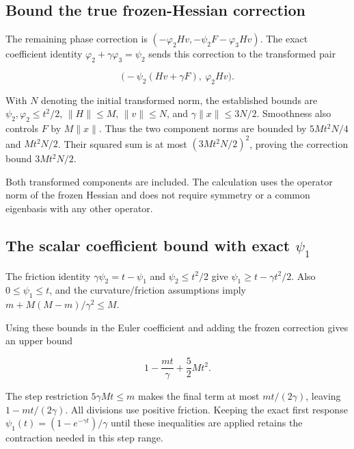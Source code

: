 \documentclass[11pt,a4paper]{report}
\begin{document}
\subsection{\texorpdfstring{Bound the true frozen-Hessian correction}{Bound the true frozen-Hessian correction}}
\label{report-step-KineticLangevin-SecondOrderLinear-lean-3}


The remaining phase correction is \((-\varphi_2Hv,-\psi_2F-\varphi_3Hv)\). The exact coefficient identity \(\varphi_2+\gamma\varphi_3=\psi_2\) sends this correction to the transformed pair

\[\bigl(-\psi_2(Hv+\gamma F),\ \varphi_2Hv\bigr).\]

With \(N\) denoting the initial transformed norm, the established bounds are \(\psi_2,\varphi_2\le t^2/2\), \(\|H\|\le M\), \(\|v\|\le N\), and \(\gamma\|x\|\le3N/2\). Smoothness also controls \(F\) by \(M\|x\|\). Thus the two component norms are bounded by \(5Mt^2N/4\) and \(Mt^2N/2\). Their squared sum is at most \((3Mt^2N/2)^2\), proving the correction bound \(3Mt^2N/2\).



Both transformed components are included. The calculation uses the operator norm of the frozen Hessian and does not require symmetry or a common eigenbasis with any other operator.

\subsection{\texorpdfstring{The scalar coefficient bound with exact \(\psi _{1}\)}{The scalar coefficient bound with exact ψ ₁}}
\label{report-step-KineticLangevin-SecondOrderLinear-lean-4}


The friction identity \(\gamma\psi_2=t-\psi_1\) and \(\psi_2\le t^2/2\) give \(\psi_1\ge t-\gamma t^2/2\). Also \(0\le\psi_1\le t\), and the curvature/\allowbreak{}friction assumptions imply \(m+M(M-m)/\gamma^2\le M\).



Using these bounds in the Euler coefficient and adding the frozen correction gives an upper bound

\[1-\frac{mt}{\gamma}+\frac52Mt^2.\]

The step restriction \(5\gamma Mt\le m\) makes the final term at most \(mt/(2\gamma)\), leaving \(1-mt/(2\gamma)\). All divisions use positive friction. Keeping the exact first response \(\psi_1(t)=(1-e^{-\gamma t})/\gamma\) until these inequalities are applied retains the contraction needed in this step range.
\end{document}
